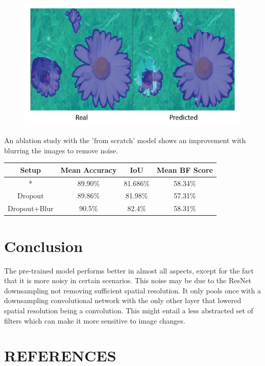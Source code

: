 \documentclass{article}
\begin{document}
\begin{figure}[H]
    \centering
    \includegraphics[width=\linewidth]{pretrainedexample.png}
\end{figure} 
An ablation study with the 'from scratch' model shows an improvement with blurring the images to remove noise.
\begin{center}
    \begin{tabular}{| c |c | c  | c |} 
     \hline
    Setup & Mean Accuracy & IoU & Mean BF Score \\ [0.5ex] 
    \hline
      * & 89.90\% & 81.686\% & 58.34\% \\ 
     \hline
     Dropout & 89.86\% & 81.98\% & 57.31\% \\ 
     \hline
     Dropout+Blur & 90.5\% & 82.4\% & 58.31\% \\ 
     \hline
    \end{tabular}
\end{center}

\section{Conclusion}
\label{sec:page}

The pre-trained model performs better in almost all aspects, except for the fact that it is more noisy in certain scenarios. This noise may be due to the ResNet downsampling not removing sufficient spatial resolution. It only pools once with a downsampling convolutional network with the only other layer that lowered spatial resolution being a convolution. This might entail a less abstracted set of filters which can make it more sensitive to image changes.



\section{REFERENCES}

\printbibliography[heading=none]
\end{document}
